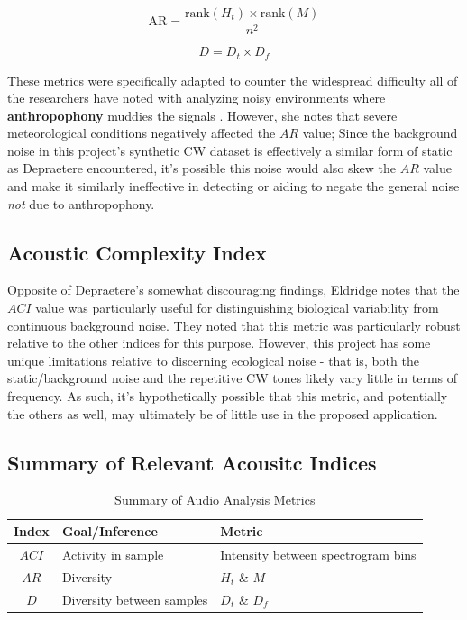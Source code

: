 \documentclass[letterpaper, 12 pt, conference]{ieeeconf}
\begin{document}
\begin{equation}
\text{AR} = \frac{\text{rank}(H_t) \times \text{rank}(M)}{n^2}
\end{equation}

\begin{equation}
D = D_t \times D_f
\end{equation}

    These metrics were specifically adapted to counter the widespread difficulty all of the researchers have noted with analyzing noisy environments where \textbf{anthropophony} muddies the signals \autocite{Depraetere}. However, she notes that severe meteorological conditions negatively affected the \textit{$AR$} value; Since the background noise in this project's synthetic CW dataset \autocite{ag1le2014} is effectively a similar form of static as Depraetere encountered, it's possible this noise would also skew the \textit{$AR$} value and make it similarly ineffective in detecting or aiding to negate the general noise \textit{not} due to anthropophony.

\subsection{Acoustic Complexity Index}
    Opposite of Depraetere's somewhat discouraging findings, Eldridge notes that the \textit{$ACI$} value was particularly useful for distinguishing biological variability from continuous background noise. They noted that this metric was particularly robust relative to the other indices for this purpose. However, this project has some unique limitations relative to discerning ecological noise - that is, both the static/background noise and the repetitive CW tones likely vary little in terms of frequency. As such, it's hypothetically possible that this metric, and potentially the others as well, may ultimately be of little use in the proposed application. 

\subsection{Summary of Relevant Acousitc Indices}
\begin{table}[h]
    \centering
    \begin{tabular}{|c|p{2.5cm}|p{2.5cm}|} %
        \hline
        \textbf{Index} & \textbf{Goal/Inference} & \textbf{Metric} \\[1ex]
        \hline
        $ACI$ & Activity in sample & Intensity between spectrogram bins \\[1ex]
        \hline
        $AR$ & Diversity & $H_t$ \& $M$ \\[1ex]
        \hline
        $D$ & Diversity between samples & $D_t$ \& $D_f$ \\ [1ex]
        \hline
    \end{tabular}
    \caption{Summary of Audio Analysis Metrics}
    \label{tab:simple_table}
\end{table}
\end{document}
